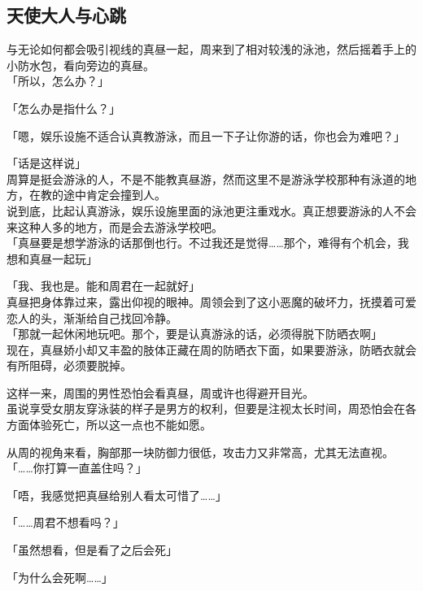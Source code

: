 \subsection{天使大人与心跳}

与无论如何都会吸引视线的真昼一起，周来到了相对较浅的泳池，然后摇着手上的小防水包，看向旁边的真昼。\\

「所以，怎么办？」

「怎么办是指什么？」

「嗯，娱乐设施不适合认真教游泳，而且一下子让你游的话，你也会为难吧？」

「话是这样说」\\

周算是挺会游泳的人，不是不能教真昼游，然而这里不是游泳学校那种有泳道的地方，在教的途中肯定会撞到人。\\

说到底，比起认真游泳，娱乐设施里面的泳池更注重戏水。真正想要游泳的人不会来这种人多的地方，而是会去游泳学校吧。\\

「真昼要是想学游泳的话那倒也行。不过我还是觉得……那个，难得有个机会，我想和真昼一起玩」

「我、我也是。能和周君在一起就好」\\

真昼把身体靠过来，露出仰视的眼神。周领会到了这小恶魔的破坏力，抚摸着可爱恋人的头，渐渐给自己找回冷静。\\

「那就一起休闲地玩吧。那个，要是认真游泳的话，必须得脱下防晒衣啊」\\

现在，真昼娇小却又丰盈的肢体正藏在周的防晒衣下面，如果要游泳，防晒衣就会有所阻碍，必须要脱掉。

这样一来，周围的男性恐怕会看真昼，周或许也得避开目光。\\

虽说享受女朋友穿泳装的样子是男方的权利，但要是注视太长时间，周恐怕会在各方面体验死亡，所以这一点也不能如愿。

从周的视角来看，胸部那一块防御力很低，攻击力又非常高，尤其无法直视。\\

「……你打算一直盖住吗？」

「唔，我感觉把真昼给别人看太可惜了……」

「……周君不想看吗？」

「虽然想看，但是看了之后会死」

「为什么会死啊……」\\

